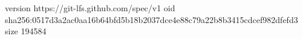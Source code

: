 version https://git-lfs.github.com/spec/v1
oid sha256:0517d3a2ac0aa16b64bfd5b18b2037dce4e88c79a22b8b3415cdcef982dfefd3
size 194584
